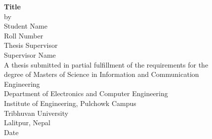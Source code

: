 \begin{titlingpage} 
\begin{center}
\textbf{Title
}\\
\vspace{2cm}
by\\
Student Name\\
Roll Number\\
\vspace{3cm}
Thesis Supervisor\\
Supervisor Name\\
\vspace{3cm}
A thesis submitted in partial fulfillment of the requirements for the\\ degree of Masters of Science in Information and Communication\\ Engineering\\
\vspace{2cm}
Department of Electronics and Computer Engineering\\
Institute of Engineering, Pulchowk Campus\\
Tribhuvan University\\
Lalitpur, Nepal\\
\vspace{2cm}
Date
\end{center}
\end{titlingpage}
\newpage